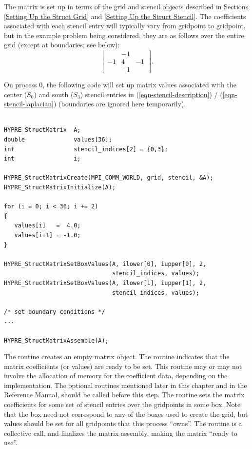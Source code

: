 The matrix is set up in terms of the grid and stencil objects
described in Sections
\ref{Setting Up the Struct Grid} and \ref{Setting Up the Struct Stencil}.
The coefficients associated with each stencil entry will typically
vary from gridpoint to gridpoint, but in the example problem being
considered, they are as follows over the entire grid (except at
boundaries; see below):
\begin{equation}\label{eqn-stencil-laplacian}
\left [
\begin{array}{ccc}
    & -1 &    \\
 -1 &  4 & -1 \\
    & -1 &    
\end{array}
\right ] .
\end{equation}

On process 0, the following code will set up matrix values associated
with the center ($S_0$) and south ($S_3$) stencil entries in
(\ref{eqn-stencil-description}) / (\ref{eqn-stencil-laplacian})
(boundaries are ignored here temporarily).
\begin{display}
\begin{verbatim}

HYPRE_StructMatrix  A;
double              values[36];
int                 stencil_indices[2] = {0,3};
int                 i;

HYPRE_StructMatrixCreate(MPI_COMM_WORLD, grid, stencil, &A);
HYPRE_StructMatrixInitialize(A);

for (i = 0; i < 36; i += 2)
{
   values[i]   =  4.0;
   values[i+1] = -1.0;
}

HYPRE_StructMatrixSetBoxValues(A, ilower[0], iupper[0], 2,
                               stencil_indices, values);
HYPRE_StructMatrixSetBoxValues(A, ilower[1], iupper[1], 2,
                               stencil_indices, values);

/* set boundary conditions */
...

HYPRE_StructMatrixAssemble(A);

\end{verbatim}
\end{display}
The  routine creates an empty matrix object.  The
 routine indicates that the matrix coefficients
(or values) are ready to be set.  This routine may or may not involve
the allocation of memory for the coefficient data, depending on the
implementation.  The optional  routines mentioned later in
this chapter and in the Reference Manual, should be called before this
step.  The  routine sets the matrix coefficients
for some set of stencil entries over the gridpoints in some box.  Note
that the box need not correspond to any of the boxes used to create
the grid, but values should be set for all gridpoints that this
process ``owns''.  The  routine is a collective call,
and finalizes the matrix assembly, making the matrix ``ready to use''.

